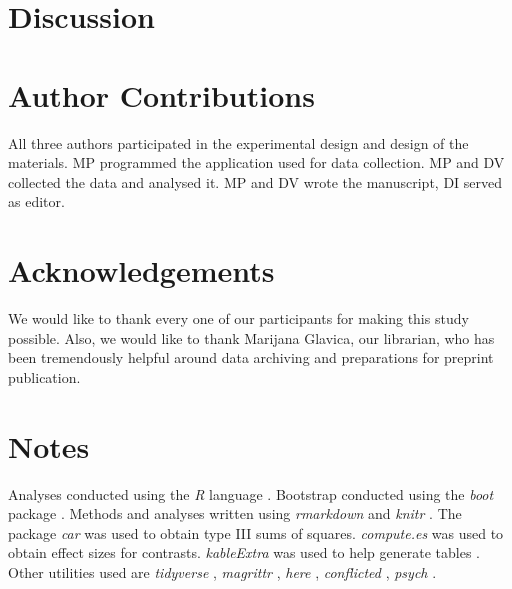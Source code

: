 \documentclass[12pt]{article}
\newcommand\specialsection{%
    \titleformat{\section}{\centering\normalsize\rmfamily}{}{0pt}{}
}
\begin{document}


\hypertarget{discussion}{%
\section{Discussion}}



\specialsection

\section{Author Contributions}

All three authors participated in the experimental design and design of
the materials.
MP programmed the application used for data collection.
MP and DV collected the data and analysed it.
MP and DV wrote the manuscript, DI served as editor.

\section{Acknowledgements}

We would like to thank every one of our participants for making this study
possible. Also, we would like to thank Marijana Glavica, our librarian,
who has been tremendously helpful around data archiving and preparations
for preprint publication.

\section{Notes}

Analyses conducted using the \textit{R} language
\citep{rcoreteamLanguageEnvironmentStatistical2019}.
Bootstrap conducted using the \textit{boot} package
\citep{cantyBootBootstrapSPlus2017}. Methods and analyses written using
\textit{rmarkdown} \citep{allaireRmarkdownDynamicDocuments2019} and
\textit{knitr} \citep{xieKnitrGeneralPurposePackage2019}. The package
\textit{car} \citep{foxCompanionAppliedRegression2011} was used to
obtain type III sums of squares. \textit{compute.es}
\citep{reComputeEsCompute2013} was used to obtain effect sizes for
contrasts. \textit{kableExtra} was used to help generate tables
\citep{zhuKableExtraConstructComplex2019}. Other utilities used are
\textit{tidyverse} \citep{wickhamTidyverseEasilyInstall2017},
\textit{magrittr} \citep{bacheMagrittrForwardPipeOperator2014},
\textit{here} \citep{mullerHereSimplerWay2017}, \textit{conflicted}
\citep{wickhamConflictedAlternativeConflict2018}, \textit{psych}
\citep{revellePsychProceduresPsychological2018}.
\end{document}
